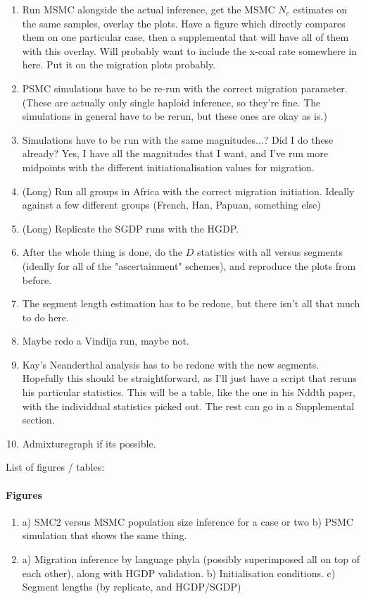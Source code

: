 \documentclass{article}
\newcommand{\cmark}{\ding{51}}%
\newcommand{\xmark}{\ding{55}}%
\begin{document}
\begin{enumerate}
    \item \xmark Run MSMC alongside the actual inference, get the MSMC $N_e$ estimates on the same samples, overlay the plots. Have a figure which directly compares them on one particular case, then a supplemental that will have all of them with this overlay. Will probably want to include the x-coal rate somewhere in here. Put it on the migration plots probably.
    \item \cmark PSMC simulations have to be re-run with the correct migration parameter. (These are actually only single haploid inference, so they're fine. The simulations in general have to be rerun, but these ones are okay as is.)
    \item \cmark Simulations have to be run with the same magnitudes...? Did I do these already? Yes, I have all the magnitudes that I want, and I've run more midpoints with the different initiationalisation values for migration. 
    \item (Long) Run all groups in Africa with the correct migration initiation. Ideally against a few different groups (French, Han, Papuan, something else)
    \item (Long) Replicate the SGDP runs with the HGDP.
    \item After the whole thing is done, do the $D$ statistics with all versus segments (ideally for all of the "ascertainment" schemes), and reproduce the plots from before.
    \item The segment length estimation has to be redone, but there isn't all that much to do here.
    \item Maybe redo a Vindija run, maybe not. 
    \item Kay's Neanderthal analysis has to be redone with the new segments. Hopefully this should be straightforward, as I'll just have a script that reruns his particular statistics. This will be a table, like the one in his Nddth paper, with the individdual statistics picked out. The rest can go in a Supplemental section.
    \item Admixturegraph if its possible.
\end{enumerate}


List of figures / tables:

\paragraph{Figures}

\begin{enumerate}
    \item a) SMC2 versus MSMC population size inference for a case or two b) PSMC simulation that shows the same thing.
    \item a) Migration inference by language phyla (possibly superimposed all on top of each other), along with HGDP validation. b) Initialisation conditions. c) Segment lengths (by replicate, and HGDP/SGDP)
    
\end{enumerate}
\end{document}
